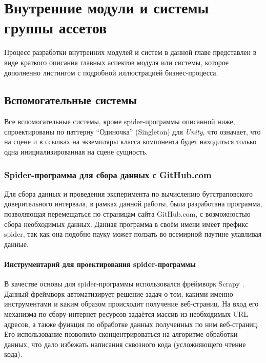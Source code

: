 \chapter{Внутренние модули и системы группы ассетов}
\label{cha:ch_2}

Процесс разработки внутренних модулей и систем в данной главе представлен в виде краткого описания главных аспектов модуля или системы, которое дополненно листингом с подробной иллюстрацией бизнес-процесса.

\section{Вспомогательные системы}
Все вспомогательные системы, кроме spider-программы описанной ниже, спроектированы по паттерну ``Одиночка'' (Singleton) для \textit{Unity}, что означает, что на сцене и в ссылках на экземпляры класса компонента будет находиться только одна инициализированная на сцене сущность.

\subsection{Spider-программа для сбора данных с GitHub.com}
Для сбора данных и проведения эксперимента по вычислению бутстраповского доверительного интервала, в рамках данной работы, была разработана программа, позволяющая перемещаться по страницам сайта GitHub.com, с возможностью сбора необходимых данных. Данная программа в своём имени имеет префикс spider, так как она подобно пауку может ползать во всемирной паутине улавливая данные.

\subsubsection*{Инструментарий для проектирования spider-программы}
В качестве основы для spider-программы использовался фреймворк Scrapy \cite{scrapy}. Данный фреймворк автоматизирует решение задач о том, какими именно инструментами и каким образом происходит получение веб-страниц. На вход его механизма по сбору интернет-ресурсов задаётся массив из необходимых URL адресов, а также функция по обработке данных полученных по ним веб-страниц. Его использование позволило сконцентрироваться на алгоритме обработки данных, что дало избежать написания сквозного кода (усложняющего чтение кода).


